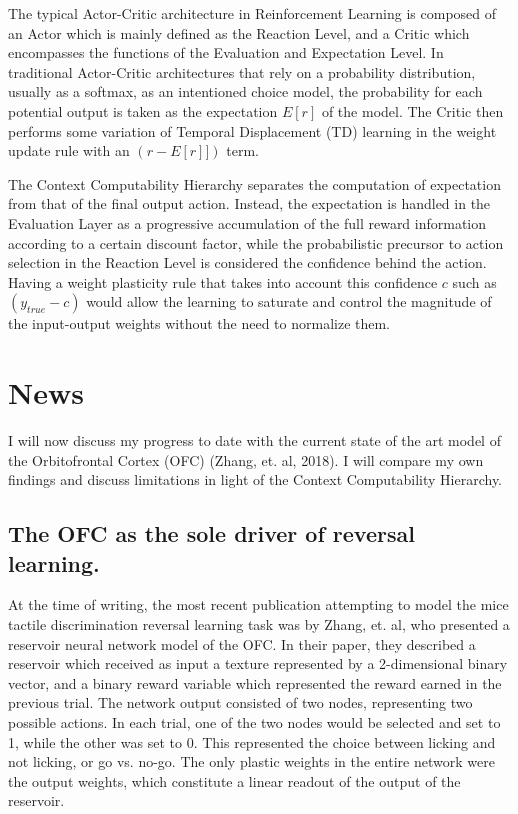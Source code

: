 \documentclass[]{article}
\begin{document}
The typical Actor-Critic architecture in Reinforcement Learning is composed of an Actor which is mainly defined as the Reaction Level, and a Critic which encompasses the functions of the Evaluation and Expectation Level.  In traditional Actor-Critic architectures that rely on a probability distribution, usually as a softmax, as an intentioned choice model, the probability for each potential output is taken as the expectation $E[r]$ of the model.  The Critic then performs some variation of Temporal Displacement (TD) learning in the weight update rule with an $(r - E[r]])$ term.  

The Context Computability Hierarchy separates the computation of expectation from that of the final output action.  Instead, the expectation is handled in the Evaluation Layer as a progressive accumulation of the full reward information according to a certain discount factor, while the probabilistic precursor to action selection in the Reaction Level is considered the confidence behind the action.  Having a weight plasticity rule that takes into account this confidence $c$ such as $(y_{true} - c)$ would allow the learning to saturate and control the magnitude of the input-output weights without the need to normalize them.

\section{News}
I will now discuss my progress to date with the current state of the art model of the Orbitofrontal Cortex (OFC) (Zhang, et. al, 2018).  I will compare my own findings and discuss limitations in light of the Context Computability Hierarchy.

\subsection{The OFC as the sole driver of reversal learning.}
At the time of writing, the most recent publication attempting to model the mice tactile discrimination reversal learning task was by Zhang, et. al, who presented a reservoir neural network model of the OFC.  In their paper, they described a reservoir which received as input a texture represented by a 2-dimensional binary vector, and a binary reward variable which represented the reward earned in the previous trial.  The network output consisted of two nodes, representing two possible actions.  In each trial, one of the two nodes would be selected and set to 1, while the other was set to 0.  This represented the choice between licking and not licking, or go vs. no-go.  The only plastic weights in the entire network were the output weights, which constitute a linear readout of the output of the reservoir.
\end{document}
